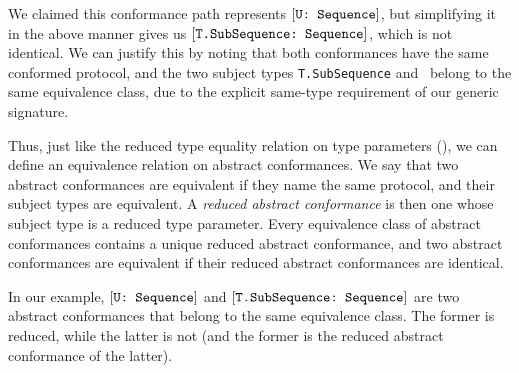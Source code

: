 \documentclass[../generics]{subfiles}
\begin{document}
We claimed this conformance path represents $[\texttt{U:~Sequence}]$, but simplifying it in the above manner gives us $[\texttt{T.SubSequence:~Sequence}]$, which is not identical. We can justify this by noting that both conformances have the same conformed protocol, and the two subject types \texttt{T.SubSequence} and \tU\ belong to the same equivalence class, due to the explicit same-type requirement of our generic signature.

Thus, just like the reduced type equality relation on type parameters (), we can define an equivalence relation on abstract conformances. We say that two abstract conformances are equivalent if they name the same protocol, and their subject types are equivalent. A \emph{reduced abstract conformance} is then one whose subject type is a reduced type parameter. Every equivalence class of abstract conformances contains a unique reduced abstract conformance, and two abstract conformances are equivalent if their reduced abstract conformances are identical.

In our example, $[\texttt{U:~Sequence}]$ and $[\texttt{T.SubSequence:~Sequence}]$ are two abstract conformances that belong to the same equivalence class. The former is reduced, while the latter is not (and the former is the reduced abstract conformance of the latter).
\end{document}
